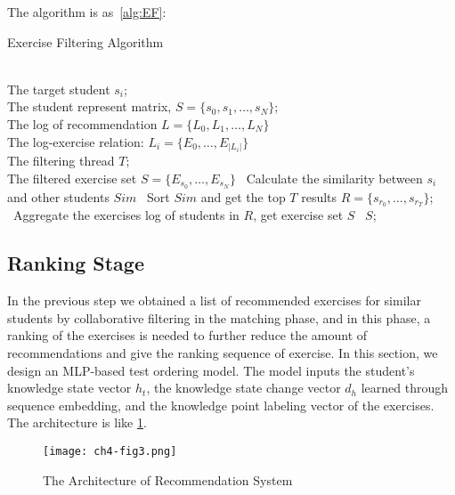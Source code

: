 The algorithm is as~\ref{alg:EF}:
\begin{algorithm}[h]
  \caption{Exercise Filtering Algorithm}\label{alg:EF}
  \begin{algorithmic}
    \REQUIRE~~\\
    The target student \(s_i\); \\
    The student represent matrix, \(S=\{s_0,s_1,\ldots,s_N\} \);\\
    The log of recommendation \(L=\{L_0,L_1,\ldots,L_N\} \) \\
    The log-exercise relation: \(L_i=\{E_0,\ldots,E_{|L_i|}\} \) \\
    The filtering thread \(T\);
    \ENSURE~~\\ %
    The filtered exercise set \(S=\{E_{s_0},\ldots,E_{s_N}\} \)
    \STATE~Calculate the similarity between \(s_i\) and other students \(Sim\)
    \STATE~Sort \(Sim\) and get the top \(T\) results \(R=\{s_{r_0},\ldots,s_{r_T}\} \);
    \STATE~Aggregate the exercises log of students in \(R\), get exercise set \(S\)
    \RETURN~\(S\); %
  \end{algorithmic}
\end{algorithm}




\subsection{Ranking Stage}

In the previous step we obtained a list of recommended exercises for similar students by collaborative filtering in the matching phase, and in this phase, a ranking of the exercises is needed to further reduce the amount of recommendations and give the ranking sequence of exercise. In this section, we design an MLP-based test ordering model. The model inputs the student's knowledge state vector \(h_t\), the knowledge state change vector \(d_h\) learned through sequence embedding, and the knowledge point labeling vector of the exercises. The architecture is like \figurename{\ref{fig:ch4-fig3}}.


\begin{figure}[h]
  \centering
  \texttt{[image: ch4-fig3.png]}
  \caption{The Architecture of Recommendation System}\label{fig:ch4-fig3}
\end{figure}

